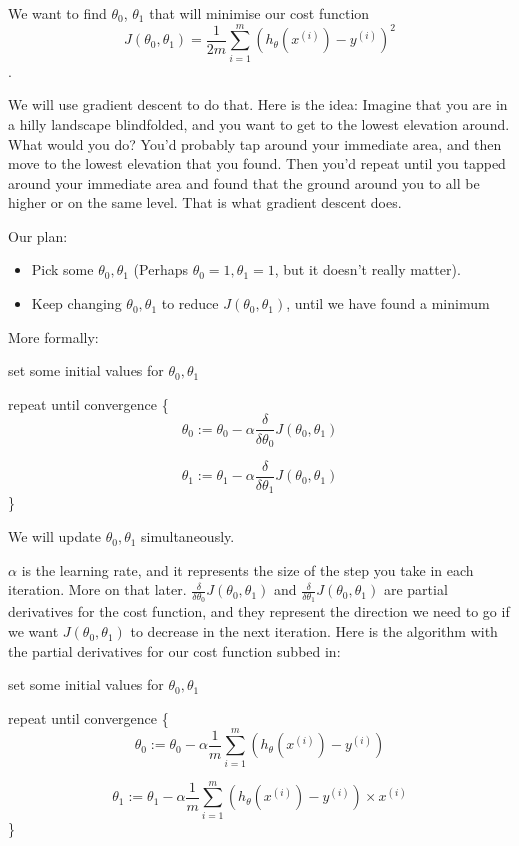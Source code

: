 \documentclass[12pt]{article}
\begin{document}
We want to find $\theta_0$, $\theta_1$ that will minimise our cost function \[J(\theta_0, \theta_1) = \frac{1}{2m} \sum^m_{i=1}(h_\theta(x^{(i)}) - y^{(i)})^2\].

We will use gradient descent to do that. Here is the idea: Imagine that you are in a hilly landscape blindfolded, and you want to get to the lowest elevation around. What would you do? You'd probably tap around your immediate area, and then move to the lowest elevation that you found. Then you'd repeat until you tapped around your immediate area and found that the ground around you to all be higher or on the same level. That is what gradient descent does.

Our plan:
\begin{itemize}
\item Pick some $\theta_0, \theta_1$ (Perhaps $\theta_0=1, \theta_1=1$, but it doesn't really matter).
\item Keep changing  $\theta_0, \theta_1$ to reduce $J(\theta_0, \theta_1)$, until we have found a minimum 
\end{itemize}

More formally:

set some initial values for $\theta_0, \theta_1$

repeat until convergence \{
\[\theta_0 := \theta_0 - \alpha \frac{\delta}{\delta \theta_0} J(\theta_0, \theta_1)\]

\[\theta_1 := \theta_1 - \alpha \frac{\delta}{\delta \theta_1} J(\theta_0, \theta_1)\]
\}


We will update  $\theta_0, \theta_1$ simultaneously. 

$\alpha$ is the learning rate, and it represents the size of the step you take in each iteration. More on that later.  $\frac{\delta}{\delta \theta_0} J(\theta_0, \theta_1) $ and $\frac{\delta}{\delta \theta_1} J(\theta_0, \theta_1) $ are partial derivatives for the cost function, and they represent the direction we need to go if we want $J(\theta_0, \theta_1)$ to decrease in the next iteration. Here is the algorithm with the partial derivatives for our cost function subbed in:

set some initial values for $\theta_0, \theta_1$

repeat until convergence \{
\[\theta_0 := \theta_0 - \alpha \frac{1}{m} \sum^m_{i=1} (h_\theta(x^{(i)}) - y^{(i)} )\]

\[\theta_1 := \theta_1 - \alpha \frac{1}{m} \sum^m_{i=1} (h_\theta(x^{(i)}) - y^{(i)}) \times x^{(i)}\]
\}
\end{document}

